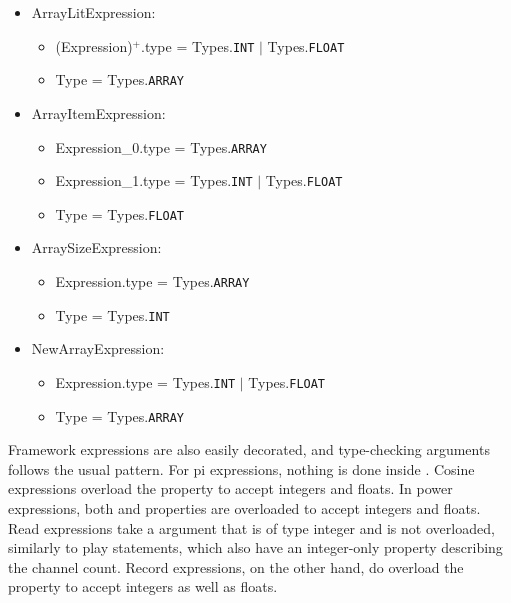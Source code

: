 \begin{itemize}
	\item ArrayLitExpression:
		\begin{itemize}
			\item (Expression)$^+$.type = Types.\texttt{INT} $|$ Types.\texttt{FLOAT}
			\item Type = Types.\texttt{ARRAY}
		\end{itemize}
	\item ArrayItemExpression:
		\begin{itemize}
			\item Expression\_0.type = Types.\texttt{ARRAY}
			\item Expression\_1.type = Types.\texttt{INT} $|$ Types.\texttt{FLOAT}
			\item Type = Types.\texttt{FLOAT}
		\end{itemize}
	\item ArraySizeExpression:
		\begin{itemize}
			\item Expression.type = Types.\texttt{ARRAY}
			\item Type = Types.\texttt{INT}
		\end{itemize}
	\item NewArrayExpression:
		\begin{itemize}
			\item Expression.type = Types.\texttt{INT} $|$ Types.\texttt{FLOAT}
			\item Type = Types.\texttt{ARRAY}
		\end{itemize}
\end{itemize}

Framework expressions are also easily decorated, and type-checking arguments follows the usual pattern. For pi expressions, nothing is done inside . Cosine expressions overload the  property to accept integers and floats. In power expressions, both  and  properties are overloaded to accept integers and floats. Read expressions take a  argument that is of type integer and is not overloaded, similarly to play statements, which also have an integer-only property describing the channel count. Record expressions, on the other hand, do overload the  property to accept integers as well as floats.


